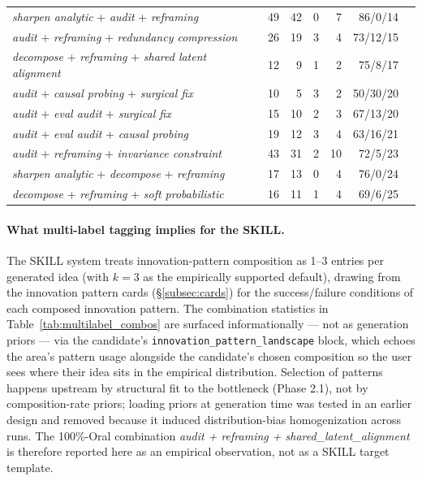 \documentclass[10pt,a4paper]{article}
\begin{document}
\begin{table}[htbp]
\begin{tabular}{p{8.4cm} r r r r r r}
\textit{sharpen analytic} + \textit{audit} + \textit{reframing}                 &  49 &  42 &  0 &   7 & 86/0/14 \\
\textit{audit} + \textit{reframing} + \textit{redundancy compression}           &  26 &  19 &  3 &   4 & 73/12/15 \\
\textit{decompose} + \textit{reframing} + \textit{shared latent alignment}      &  12 &   9 &  1 &   2 & 75/8/17 \\
\textit{audit} + \textit{causal probing} + \textit{surgical fix}                &  10 &   5 &  3 &   2 & 50/30/20 \\
\textit{audit} + \textit{eval audit} + \textit{surgical fix}                    &  15 &  10 &  2 &   3 & 67/13/20 \\
\textit{audit} + \textit{eval audit} + \textit{causal probing}                  &  19 &  12 &  3 &   4 & 63/16/21 \\
\textit{audit} + \textit{reframing} + \textit{invariance constraint}            &  43 &  31 &  2 &  10 & 72/5/23 \\
\textit{sharpen analytic} + \textit{decompose} + \textit{reframing}             &  17 &  13 &  0 &   4 & 76/0/24 \\
\textit{decompose} + \textit{reframing} + \textit{soft probabilistic}           &  16 &  11 &  1 &   4 & 69/6/25 \\
\bottomrule
\end{tabular}
\end{table}

\paragraph{What multi-label tagging implies for the SKILL.} The SKILL system treats innovation-pattern composition as 1--3 entries per generated idea (with \(k = 3\) as the empirically supported default), drawing from the innovation pattern cards (\S\ref{subsec:cards}) for the success/failure conditions of each composed innovation pattern. The combination statistics in Table~\ref{tab:multilabel_combos} are surfaced informationally --- not as generation priors --- via the candidate's \texttt{innovation\_pattern\_landscape} block, which echoes the area's pattern usage alongside the candidate's chosen composition so the user sees where their idea sits in the empirical distribution. Selection of patterns happens upstream by structural fit to the bottleneck (Phase 2.1), not by composition-rate priors; loading priors at generation time was tested in an earlier design and removed because it induced distribution-bias homogenization across runs. The 100\%-Oral combination \emph{audit + reframing + shared\_latent\_alignment} is therefore reported here as an empirical observation, not as a SKILL target template.
\end{document}
